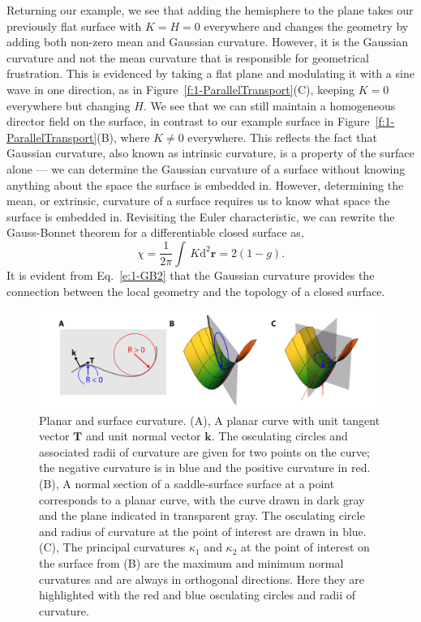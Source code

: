 Returning our example, we see that adding the hemisphere to the plane takes our previously flat surface with $K = H = 0$ everywhere and changes the geometry by adding both non-zero mean and Gaussian curvature.
However, it is the Gaussian curvature and not the mean curvature that is responsible for geometrical frustration.
This is evidenced by taking a flat plane and modulating it with a sine wave in one direction, as in Figure~\ref{f:1-ParallelTransport}(C), keeping $K=0$ everywhere but changing $H$.
We see that we can still maintain a homogeneous director field on the surface, in contrast to our example surface in Figure~\ref{f:1-ParallelTransport}(B), where $K \neq 0$ everywhere.
This reflects the fact that Gaussian curvature, also known as intrinsic curvature, is a property of the surface alone --- we can determine the Gaussian curvature of a surface without knowing anything about the space the surface is embedded in.
However, determining the mean, or extrinsic, curvature of a surface requires us to know what space the surface is embedded in.
Revisiting the Euler characteristic, we can rewrite the Gauss-Bonnet theorem for a differentiable closed surface as,
\begin{equation}
  \chi = \frac{1}{2 \pi} \int \, K \textrm{d}^2\mathbf{r} = 2(1-g)\label{e:1-GB2}.
\end{equation}
It is evident from Eq.~\ref{e:1-GB2} that the Gaussian curvature provides the connection between the local geometry and the topology of a closed surface.
\begin{figure}
  \centering
  \includegraphics{figures/C1/Ch1-Figs_Curvature.png}
  \caption{Planar and surface curvature.
  (A), A planar curve with unit tangent vector $\mathbf{T}$ and unit normal vector $\mathbf{k}$. The osculating circles and associated radii of curvature are given for two points on the curve; the negative curvature is in blue and the positive curvature in red.
  (B), A normal section of a saddle-surface surface at a point corresponds to a planar curve, with the curve drawn in dark gray and the plane indicated in transparent gray.
  The osculating circle and radius of curvature at the point of interest are drawn in blue.
  (C), The principal curvatures $\kappa_1$ and $\kappa_2$ at the point of interest on the surface from (B) are the maximum and minimum normal curvatures and are always in orthogonal directions. Here they are highlighted with the red and blue osculating circles and radii of curvature.}\label{f:1-Curvature}
\end{figure}

